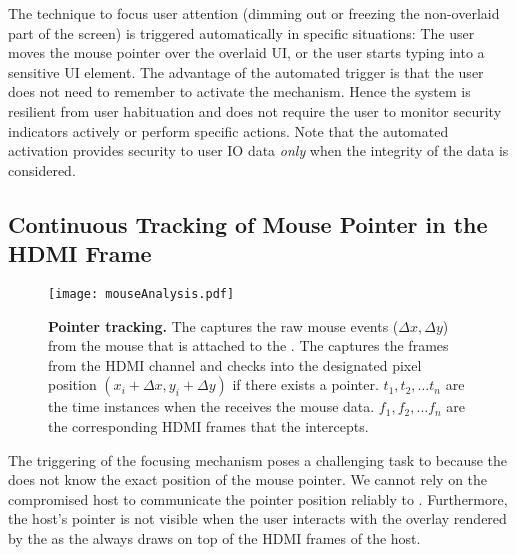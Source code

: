
\parasave
{} The technique to focus user attention (dimming out or freezing the non-overlaid part of the screen) is triggered automatically in specific situations: The user moves the mouse pointer over the overlaid UI, or the user starts typing into a sensitive UI element. 
The advantage of the automated trigger is that the user does not need to remember to activate the mechanism. Hence the system is resilient from user habituation and does not require the user to monitor security indicators actively or perform specific actions. Note that the automated activation provides security to user IO data \emph{only} when the integrity of the data is considered.

\subsection{Continuous Tracking of Mouse Pointer in the HDMI Frame}
\label{sec:systemDesign:analysis}


\begin{figure}[t]
\centering
\texttt{[image: mouseAnalysis.pdf]}
\caption{\textbf{Pointer tracking.} \one The \device captures the raw mouse events ($\Delta x, \Delta y$) from the mouse that is attached to the \device. \two The \device captures the frames from the HDMI channel and checks into the designated pixel position $(x_i + \Delta x, y_i + \Delta y)$ if there exists a pointer. $t_1, t_2,\ldots t_n$ are the time instances when the \device receives the mouse data. $f_1, f_2,\ldots f_n$ are the corresponding HDMI frames that the \device intercepts.}
\spacesave
\label{fig:mouseAnalysis}
\centering
\end{figure}


The triggering of the focusing mechanism poses a challenging task to \name because the \device does not know the exact position of the mouse pointer. We cannot rely on the compromised host to communicate the pointer position reliably to \device. Furthermore, the host's pointer is not visible when the user interacts with the overlay rendered by the \device as the \device always draws on top of the HDMI frames of the host. 

